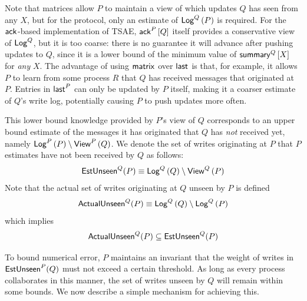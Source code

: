 \documentclass[]             %
{NASA}                       %
\theoremstyle{definition}
\begin{document}
Note that matrices allow $P$ to maintain a view of which updates $Q$
has seen from any $X$, but for the protocol, only an estimate of
$\mathsf{Log}^{Q}\left(P\right)$ is required. For the $\mathsf{ack}^{}$-based implementation of
TSAE, $\mathsf{ack}^{P}\left[Q\right]$ itself provides a conservative view of $\mathsf{Log}^{Q}$,
but it is too coarse: there is no guarantee it will advance after
pushing updates to $Q$, since it is a lower bound of the minimum value
of $\mathsf{summary}^{Q}\left[X\right]$ for \emph{any} $X$. The advantage of using
$\mathsf{matrix}^{}$ over $\mathsf{last}^{}$ is that, for example, it allows $P$
to learn from some process $R$ that $Q$ has received messages that
originated at $P$. Entries in $\mathsf{last}^{P}$ can only be updated by $P$
itself, making it a coarser estimate of $Q$'s write log, potentially
causing $P$ to push updates more often.

This lower bound knowledge provided by $P$'s view of $Q$ corresponds
to an upper bound estimate of the messages it has originated that $Q$
has \emph{not} received yet, namely
$\mathsf{Log}^{P}\left(P\right) \setminus \mathsf{View}^{P}\left(Q\right)$. We denote the set of writes
originating at $P$ that $P$ estimates have not been received by $Q$ as
follows:
\begin{equation*}
  \mathsf{EstUnseen}^{Q}{\left(P\right)} \equiv \mathsf{Log}^{Q}\left(Q\right) \setminus \mathsf{View}^{Q}\left(P\right)
\end{equation*}
Note that the actual set of writes originating at $Q$ unseen by $P$ is
defined
\begin{equation*}
  \mathsf{ActualUnseen}^{Q}{\left(P\right)} \equiv \mathsf{Log}^{Q}\left(Q\right) \setminus \mathsf{Log}^{Q}\left(P\right)
\end{equation*}
which implies
\begin{equation*}
  \mathsf{ActualUnseen}^{Q}{\left(P\right)} \subseteq \mathsf{EstUnseen}^{Q}{\left(P\right)}
\end{equation*}

To bound numerical error, $P$ maintains an invariant that the weight
of writes in $\mathsf{EstUnseen}^{P}{\left(Q\right)}$ must not exceed a
certain threshold. As long as every process collaborates in this
manner, the set of writes unseen by $Q$ will remain within some
bounds. We now describe a simple mechanism for achieving this.
\end{document}
